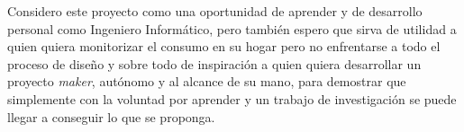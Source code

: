 \documentclass[a4paper,10pt]{article}
\begin{document}
Considero este proyecto como una oportunidad de aprender y de
desarrollo personal como Ingeniero Informático, pero también espero
que sirva de utilidad a quien quiera monitorizar el consumo en su
hogar pero no enfrentarse a todo el proceso de diseño y sobre todo de
inspiración a quien quiera desarrollar un proyecto \textit{maker},
autónomo y al alcance de su mano, para demostrar que simplemente con
la voluntad por aprender y un trabajo de investigación se puede llegar
a conseguir lo que se proponga.

\newpage


 
\end{document}
